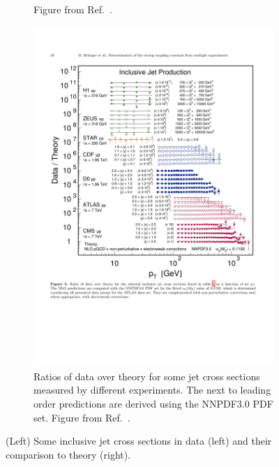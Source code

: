 \begin{figure}
\begin{subfigure}{.45\textwidth}
{  Figure from Ref.~\cite{Olive_2016}.}
  \label{fig:jetcs_pp}
\end{subfigure}
\qquad  \qquad  
\begin{subfigure}{.45\textwidth}  
  \centering
  \includegraphics[width=\linewidth]{figures/theory/jetcs_pp_theory_comparison}
  \caption{Ratios of data over theory for some jet cross sections measured by different experiments.
  The next to leading order predictions are derived using the NNPDF3.0 PDF set.
  Figure from Ref.~\cite{Britzger:2017maj}.}
  \label{fig:jetcs_pp_theory_comparison}
\end{subfigure}
\caption{(Left) Some inclusive jet cross sections in data (left) and their comparison to theory (right).}
\label{fig:jetcs}
\end{figure}


